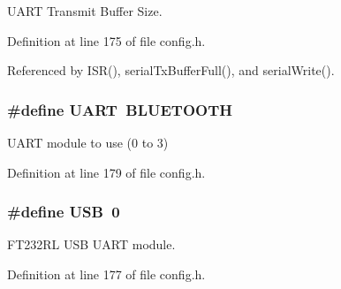 U\-A\-R\-T Transmit Buffer Size. 



Definition at line 175 of file config.\-h.



Referenced by I\-S\-R(), serial\-Tx\-Buffer\-Full(), and serial\-Write().

\hypertarget{group__config_gaf7cb12b462b4594bd759d1b4e241ec4c}{
\subsubsection[{U\-A\-R\-T}]{\setlength{\rightskip}{0pt plus 5cm}\#define U\-A\-R\-T~{\bf B\-L\-U\-E\-T\-O\-O\-T\-H}}}\label{group__config_gaf7cb12b462b4594bd759d1b4e241ec4c}


U\-A\-R\-T module to use (0 to 3) 



Definition at line 179 of file config.\-h.

\hypertarget{group__config_ga779bf099075a999d1074357fccbd466b}{
\subsubsection[{U\-S\-B}]{\setlength{\rightskip}{0pt plus 5cm}\#define U\-S\-B~0}}\label{group__config_ga779bf099075a999d1074357fccbd466b}


F\-T232\-R\-L U\-S\-B U\-A\-R\-T module. 



Definition at line 177 of file config.\-h.

